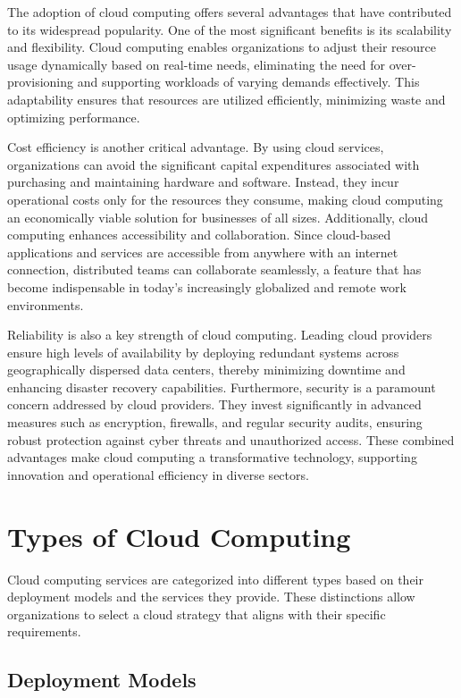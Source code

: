 The adoption of cloud computing offers several advantages that have contributed to its widespread popularity. One of the most significant benefits is its scalability and flexibility. Cloud computing enables organizations to adjust their resource usage dynamically based on real-time needs, eliminating the need for over-provisioning and supporting workloads of varying demands effectively. This adaptability ensures that resources are utilized efficiently, minimizing waste and optimizing performance.

Cost efficiency is another critical advantage. By using cloud services, organizations can avoid the significant capital expenditures associated with purchasing and maintaining hardware and software. Instead, they incur operational costs only for the resources they consume, making cloud computing an economically viable solution for businesses of all sizes. Additionally, cloud computing enhances accessibility and collaboration. Since cloud-based applications and services are accessible from anywhere with an internet connection, distributed teams can collaborate seamlessly, a feature that has become indispensable in today’s increasingly globalized and remote work environments.

Reliability is also a key strength of cloud computing. Leading cloud providers ensure high levels of availability by deploying redundant systems across geographically dispersed data centers, thereby minimizing downtime and enhancing disaster recovery capabilities. Furthermore, security is a paramount concern addressed by cloud providers. They invest significantly in advanced measures such as encryption, firewalls, and regular security audits, ensuring robust protection against cyber threats and unauthorized access. These combined advantages make cloud computing a transformative technology, supporting innovation and operational efficiency in diverse sectors.

\section{Types of Cloud Computing}

Cloud computing services are categorized into different types based on their deployment models and the services they provide. These distinctions allow organizations to select a cloud strategy that aligns with their specific requirements.

\subsection{Deployment Models}

